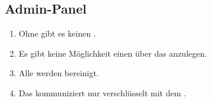 \subsection{Admin-Panel}

\begin{enumerate}
    \item Ohne %
        gibt es keinen %
        .
    \item Es gibt keine Möglichkeit einen %
        über das %
        anzulegen.
    \item Alle %
        werden bereinigt.
    \item Das %
        kommuniziert nur verschlüsselt mit dem %
        .
\end{enumerate}